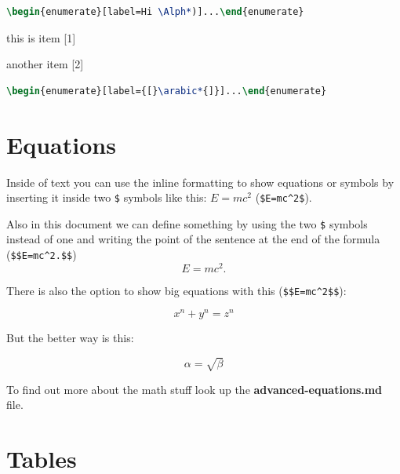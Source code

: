 \documentclass{article}				%
\begin{document}
\begin{lstlisting}[language=tex,frame=single]
\begin{enumerate}[label=Hi \Alph*)]...\end{enumerate}
\end{lstlisting}

\begin{enumerate}[label={[}\arabic*{]}]
	\item this is item [1]
	\item another item [2]
\end{enumerate}

\begin{lstlisting}[language=tex,frame=single]
\begin{enumerate}[label={[}\arabic*{]}]...\end{enumerate}
\end{lstlisting}


\section{Equations}

Inside of text you can use the inline formatting to show equations or symbols by inserting it inside two \verb|$| symbols like this: $E=mc^2$ (\verb|$E=mc^2$|).

\vspace{5mm}

Also in this document we can define something by using the two \verb|$| symbols instead of one and writing the point of the sentence at the end of the formula (\verb|$$E=mc^2.$$|)  $$E=mc^2.$$

\vspace{5mm}

There is also the option to show big equations with this (\verb|$$E=mc^2$$|):

$$x^n+y^n=z^n$$

But the better way is this:

\begin{equation}
\label{simple_equation}
\alpha = \sqrt{ \beta }
\end{equation}

To find out more about the math stuff look up the \textbf{advanced-equations.md} file.

\newpage

\section{Tables}
\end{document}
